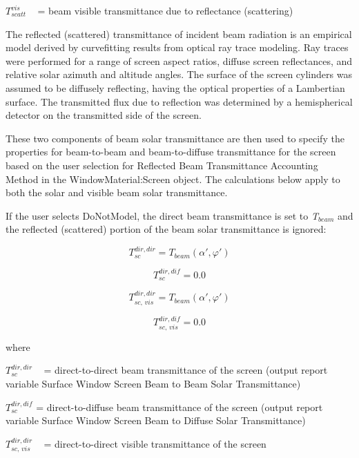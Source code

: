 \(T_{scatt}^{vis}\) ~ = beam visible transmittance due to reflectance (scattering)

The reflected (scattered) transmittance of incident beam radiation is an empirical model derived by curvefitting results from optical ray trace modeling. Ray traces were performed for a range of screen aspect ratios, diffuse screen reflectances, and relative solar azimuth and altitude angles. The surface of the screen cylinders was assumed to be diffusely reflecting, having the optical properties of a Lambertian surface. The transmitted flux due to reflection was determined by a hemispherical detector on the transmitted side of the screen.

These two components of beam solar transmittance are then used to specify the properties for beam-to-beam and beam-to-diffuse transmittance for the screen based on the user selection for Reflected Beam Transmittance Accounting Method in the WindowMaterial:Screen object. The calculations below apply to both the solar and visible beam solar transmittance.

If the user selects DoNotModel, the direct beam transmittance is set to \emph{T\(_{beam}\)} and the reflected (scattered) portion of the beam solar transmittance is ignored:

\begin{equation}
T_{sc}^{dir,dir} = {T_{beam}}\left( {\alpha ',\varphi '} \right)
\end{equation}

\begin{equation}
T_{sc}^{dir,dif} = 0.0
\end{equation}

\begin{equation}
T_{sc,\,vis}^{dir,dir} = {T_{beam}}\left( {\alpha ',\varphi '} \right)
\end{equation}

\begin{equation}
T_{sc,\,vis}^{dir,dif} = 0.0
\end{equation}

where

\(T_{sc}^{dir,dir}\) ~ = direct-to-direct beam transmittance of the screen (output report variable Surface Window Screen Beam to Beam Solar Transmittance)

\(T_{sc}^{dir,dif}\) = direct-to-diffuse beam transmittance of the screen (output report variable Surface Window Screen Beam to Diffuse Solar Transmittance)

\(T_{sc,\,vis}^{dir,dir}\) ~ = direct-to-direct visible transmittance of the screen

